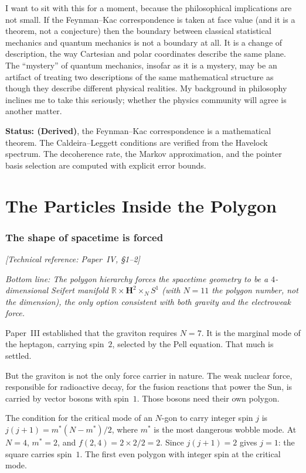 I want to sit with this for a moment, because the philosophical
implications are not small. If the Feynman--Kac correspondence is
taken at face value (and it is a theorem, not a conjecture) then
the boundary between classical statistical mechanics and quantum
mechanics is not a boundary at all. It is a change of description, the
way Cartesian and polar coordinates describe the same plane. The
``mystery'' of quantum mechanics, insofar as it is a mystery, may be
an artifact of treating two descriptions of the same mathematical
structure as though they describe different physical realities. My
background in philosophy inclines me to take this seriously; whether
the physics community will agree is another matter.

\textbf{Status: (Derived)}, the Feynman--Kac correspondence is a
mathematical theorem. The Caldeira--Leggett conditions are verified
from the Havelock spectrum. The decoherence rate, the Markov
approximation, and the pointer basis selection are computed with
explicit error bounds.


\part{The Particles Inside the Polygon}


\section{The shape of spacetime is forced}
\noindent\textit{[Technical reference: Paper~IV, \S1--2]}

\medskip

\noindent\textit{Bottom line: The polygon hierarchy forces the spacetime
geometry to be a $4$-dimensional Seifert manifold
$\mathbb{R} \times \mathbf{H}^2 \times_{N} S^1$
(with $N = 11$ the polygon number, not the dimension), the only option
consistent with both gravity and the electroweak force.}

\medskip

Paper~III established that the graviton requires $N = 7$. It is the
marginal mode of the heptagon, carrying spin~$2$, selected by the
Pell equation. That much is settled.

But the graviton is not the only force carrier in nature. The weak
nuclear force, responsible for radioactive decay, for the fusion
reactions that power the Sun, is carried by vector bosons with
spin~$1$. Those bosons need their own polygon.

The condition for the critical mode of an $N$-gon to carry integer
spin $j$ is $j(j+1) = m^*(N - m^*)/2$, where $m^*$ is the most
dangerous wobble mode. At $N = 4$, $m^* = 2$, and
$f(2, 4) = 2 \times 2/2 = 2$. Since $j(j+1) = 2$ gives $j = 1$:
the square carries spin~$1$. The first even polygon with integer
spin at the critical mode.

